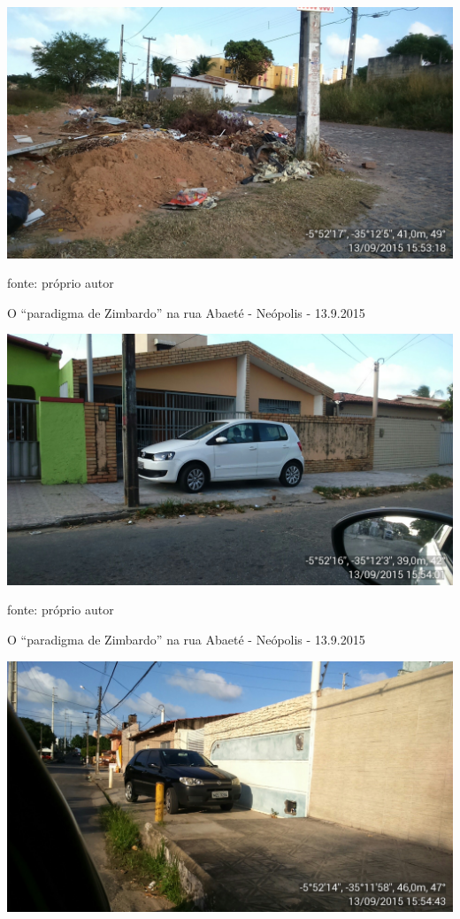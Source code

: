 \documentclass[
	12pt,				%
	openright,			%
	twoside,			%
	a4paper,			%
	chapter=TITLE,		%
	section=TITLE,		%
	subsection=TITLE,	%
	subsubsection=TITLE,%
	spanish,            %
	english,			%
	brazil				%
	]{abntex2}
\begin{document}
\begin{anexosenv}
\begin{foto}[!htpb]
\begin{center}
		\includegraphics[scale=0.23]{abaete2.jpg}
	\end{center}
	\ABNTEXchapterfont\small{fonte: próprio autor}
\end{foto}
\begin{foto}[!htpb]
	\caption{\label{FotoD}O “paradigma de Zimbardo” na rua Abaeté - Neópolis - 13.9.2015}
	\begin{center}
		\includegraphics[scale=0.23]{abaete3.jpg}
	\end{center}
	\ABNTEXchapterfont\small{fonte: próprio autor}
\end{foto}
\begin{foto}[!htpb]
	\caption{\label{FotoE}O “paradigma de Zimbardo” na rua Abaeté - Neópolis - 13.9.2015}
	\begin{center}
		\includegraphics[scale=0.23]{abaete4.jpg}

\end{center}
\end{foto}
\end{anexosenv}
\end{document}

